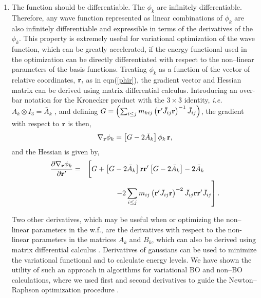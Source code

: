 {{\begin{enumerate}
\item  
The function should be differentiable.
The $\phi_k$ are infinitely 
differentiable. Therefore, any wave function 
represented as linear combinations 
of $\phi_k$ are also infinitely
differentiable and expressible in terms 
of the derivatives of the $\phi_k$.
This property is extremely useful for
variational optimization of the wave function,
which can be greatly accelerated, if 
the energy functional used in the optimization
can be directly differentiated with respect
to the non--linear parameters of the basis 
functions.
Treating $%
\phi_k$ as a function of the vector of 
relative coordinates, ${\bf r,}$
as in eqn(\ref{phir}), the gradient 
vector and Hessian matrix can be derived
using matrix differential 
calculus\cite{Kinghorn95a}. Introducing an
over-bar notation for the Kronecker 
product with the $3\times 3$ identity, 
{\it i.e.} $A_k\otimes I_3=\bar{A}_k\,\,$, and defining $G=\left(
\sum_{i\leq j}m_{kij}\left( {\bf r}^{\prime }\bar{J}_{ij}{\bf r}%
\right) ^{-1}\bar{J}_{ij}\right) $, the gradient with respect to ${\bf r}
$ is then, 
\begin{equation}
\nabla _{{\bf r}}\phi _k=\left[ G-2\bar{A}_k\right] \phi _k\,{\bf r,}
\end{equation}
and the Hessian is given by, 
\begin{eqnarray}
\frac{\partial \nabla _{{\bf r}}\phi _k}{\partial {\bf r}^{\prime }}
&=&\left[ G+\left[ G-2\bar{A}_k\right] {\bf rr}^{\prime }\left[ G-2\bar{A}%
_k\right] -2\bar{A}_k\mathstrut \strut 
\begin{array}{ll}
&  \\ 
& 
\end{array}
\right.   \nonumber \\
&&\left. -2\sum_{i\leq j}m_{ij}\left( {\bf r}^{\prime }\bar{J}_{ij}%
{\bf r}\right) ^{-2}\bar{J}_{ij}{\bf rr}^{\prime }\bar{J}_{ij}\right] .
\end{eqnarray}

Two other derivatives, which may be useful when 
or optimizing the non--linear parameters in the w.f.,
are the
derivatives with respect to the 
non-linear parameters in the matrices $A_k$
and $B_k$, which can also be derived 
using matrix differential calculus
\cite{Kinghorn95a}. 
Derivatives of gaussians can be used to 
minimize the variational functional and to calculate
energy levels. We have shown the utility of such an approach
in algorithms for variational BO and non--BO calculations,
where we used first and second derivatives to guide
the Newton--Raphson optimization procedure
\cite{A8,A14,A21,A38,kozlowski92b}. 


\end{enumerate}}}
